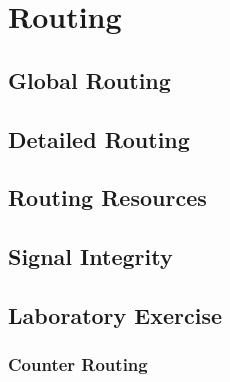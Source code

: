 \chapter{Routing}

\section{Global Routing}

\section{Detailed Routing}

\section{Routing Resources}

\section{Signal Integrity}

\section{Laboratory Exercise}

\subsection*{Counter Routing}
